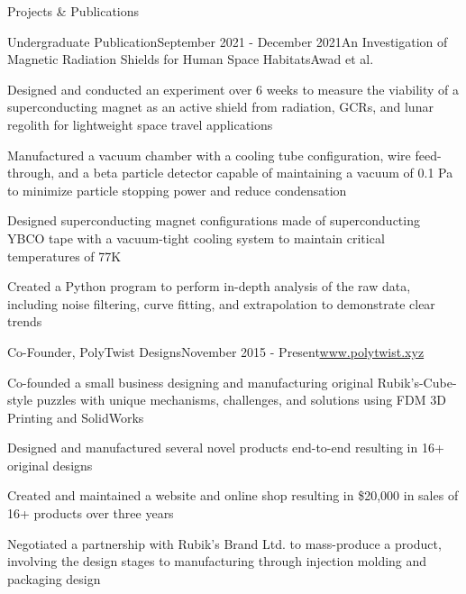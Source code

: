 \documentclass{resume} %
\newenvironment{CVmode}{\comment}{\endcomment} %
\begin{document}
\begin{rSection}{Projects \& Publications}

\begin{rSubsection}{Undergraduate Publication}{September 2021 - December 2021}{An Investigation of Magnetic Radiation Shields for Human Space Habitats}{Awad et al.}
\item Designed and conducted an experiment over 6 weeks to measure the viability of a superconducting magnet as an active shield from radiation, GCRs, and lunar regolith for lightweight space travel applications
\item Manufactured a vacuum chamber with a cooling tube configuration, wire feed-through, and a beta particle detector capable of maintaining a vacuum of 0.1 Pa to minimize particle stopping power and reduce condensation
\item Designed superconducting magnet configurations made of superconducting YBCO tape with a vacuum-tight cooling system to maintain critical temperatures of 77K
\item Created a Python program to perform in-depth analysis of the raw data, including noise filtering, curve fitting, and extrapolation to demonstrate clear trends

\end{rSubsection}

\begin{CVmode}

\begin{rSubsection}{Co-Founder, PolyTwist Designs}{November 2015 - Present}{\url{www.polytwist.xyz}}{}
\item Co-founded a small business designing and manufacturing original Rubik's-Cube-style puzzles with unique mechanisms, challenges, and solutions using FDM 3D Printing and SolidWorks
\item Designed and manufactured several novel products end-to-end resulting in 16+ original designs
\item Created and maintained a website and online shop resulting in \$20,000 in sales of 16+ products over three years
\item Negotiated a partnership with Rubik's Brand Ltd. to mass-produce a product, involving the design stages to manufacturing through injection molding and packaging design

\end{rSubsection}

\end{CVmode}

\end{rSection}
\end{document}
